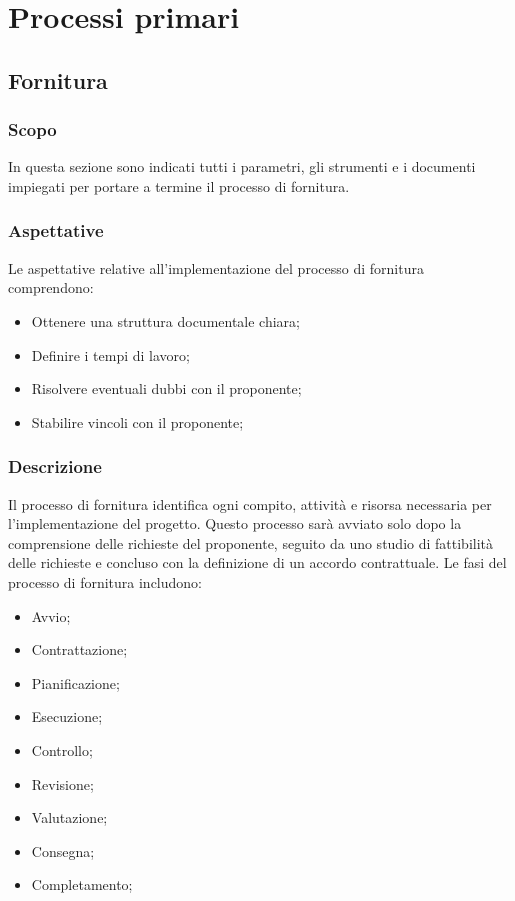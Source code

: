\documentclass{article}
\begin{document}
\section{Processi primari}

\subsection{Fornitura}

\subsubsection{Scopo}
In questa sezione sono indicati tutti i parametri, gli strumenti e i documenti impiegati per portare a termine il processo di fornitura.

\subsubsection{Aspettative}
Le aspettative relative all'implementazione del processo di fornitura comprendono:
\begin{itemize}
    \item Ottenere una struttura documentale chiara;
    \item Definire i tempi di lavoro;
    \item Risolvere eventuali dubbi con il proponente;
    \item Stabilire vincoli con il proponente;
\end{itemize}

\subsubsection{Descrizione}
Il processo di fornitura identifica ogni compito, attività e risorsa necessaria per l'implementazione del progetto. Questo processo sarà avviato solo dopo la comprensione delle richieste del proponente, seguito da uno studio di fattibilità delle richieste e concluso con la definizione di un accordo contrattuale. Le fasi del processo di fornitura includono:
\begin{itemize}
    \item Avvio;
    \item Contrattazione;
    \item Pianificazione;
    \item Esecuzione;
    \item Controllo;
    \item Revisione;
    \item Valutazione;
    \item Consegna;
    \item Completamento;
\end{itemize}
\end{document}
